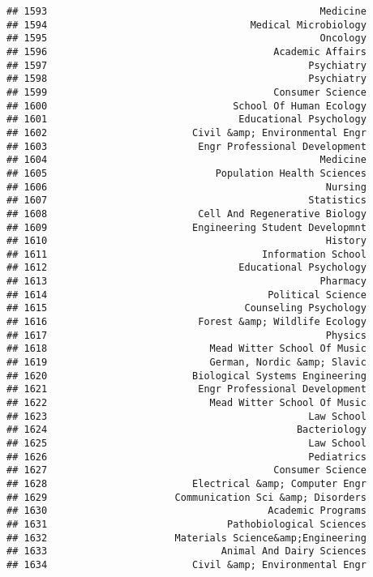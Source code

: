 \documentclass[
]{article}
\begin{document}
\begin{verbatim}
## 1593                                               Medicine
## 1594                                   Medical Microbiology
## 1595                                               Oncology
## 1596                                       Academic Affairs
## 1597                                             Psychiatry
## 1598                                             Psychiatry
## 1599                                       Consumer Science
## 1600                                School Of Human Ecology
## 1601                                 Educational Psychology
## 1602                         Civil &amp; Environmental Engr
## 1603                          Engr Professional Development
## 1604                                               Medicine
## 1605                             Population Health Sciences
## 1606                                                Nursing
## 1607                                             Statistics
## 1608                          Cell And Regenerative Biology
## 1609                         Engineering Student Developmnt
## 1610                                                History
## 1611                                     Information School
## 1612                                 Educational Psychology
## 1613                                               Pharmacy
## 1614                                      Political Science
## 1615                                  Counseling Psychology
## 1616                          Forest &amp; Wildlife Ecology
## 1617                                                Physics
## 1618                            Mead Witter School Of Music
## 1619                            German, Nordic &amp; Slavic
## 1620                         Biological Systems Engineering
## 1621                          Engr Professional Development
## 1622                            Mead Witter School Of Music
## 1623                                             Law School
## 1624                                           Bacteriology
## 1625                                             Law School
## 1626                                             Pediatrics
## 1627                                       Consumer Science
## 1628                         Electrical &amp; Computer Engr
## 1629                      Communication Sci &amp; Disorders
## 1630                                      Academic Programs
## 1631                               Pathobiological Sciences
## 1632                      Materials Science&amp;Engineering
## 1633                              Animal And Dairy Sciences
## 1634                         Civil &amp; Environmental Engr

\end{verbatim}
\end{document}

